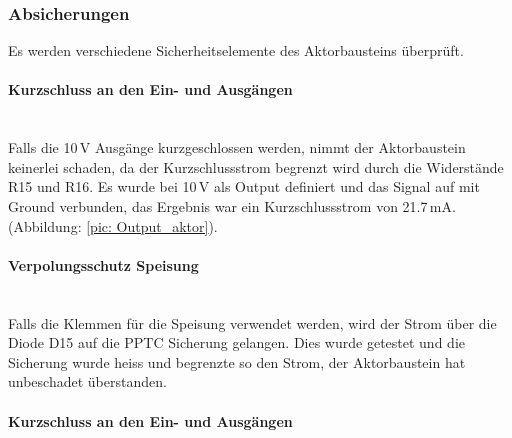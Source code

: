 \subsubsection{Absicherungen}
Es werden verschiedene Sicherheitselemente des Aktorbausteins überprüft.

\paragraph{Kurzschluss an den Ein- und Ausgängen}\\
Falls die 10\,V Ausgänge kurzgeschlossen werden, nimmt der Aktorbaustein keinerlei schaden, da der Kurzschlussstrom begrenzt wird durch die Widerstände R15 und R16. Es wurde bei 10\,V als Output definiert und das Signal auf mit Ground verbunden, das Ergebnis war ein Kurzschlussstrom von 21.7\,mA. (Abbildung: \ref{pic: Output_aktor}).

\paragraph{Verpolungsschutz Speisung}\\
Falls die Klemmen für die Speisung verwendet werden, wird der Strom über die Diode D15 auf die PPTC Sicherung gelangen. Dies wurde getestet und die Sicherung wurde heiss und begrenzte so den Strom, der Aktorbaustein hat unbeschadet überstanden.


\paragraph{Kurzschluss an den Ein- und Ausgängen}\\


